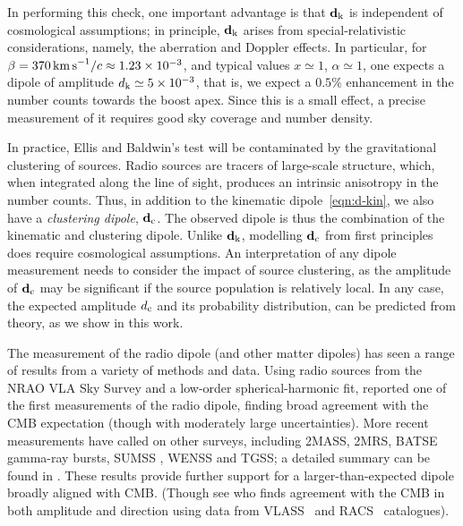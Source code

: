 \documentclass[fleqn,usenatbib]{mnras}
\def\kin{{\rm k}}
\def\clu{{\rm c}}
\def\dkin{\mathbf{d}_{\kin}}
\def\dint{\mathbf{d}_{\clu}}
\begin{document}
In performing this check, one important advantage
is that $\dkin$ is independent of cosmological
assumptions; in principle, $\dkin$ arises from special-relativistic considerations, namely, the aberration and
Doppler effects. 
In particular, for $\beta=370\,{\rm km\,s}^{-1}/c\approx1.23\times10^{-3}$, and typical values
$x\simeq1$, $\alpha\simeq1$, one expects a dipole of amplitude $d_\kin\simeq5\times10^{-3}$, 
that is, we expect a $0.5\%$ enhancement in the number counts towards the boost apex. Since this is a small
effect, a precise measurement of it requires good sky coverage and number density.

In practice, Ellis and Baldwin's  test will  be contaminated by the gravitational
clustering of sources. Radio sources are tracers of large-scale structure, which,
when integrated along the line of sight, produces an intrinsic anisotropy in the number counts. 
Thus, in addition to the kinematic
dipole~\eqref{eqn:d-kin}, we also have a \emph{clustering dipole}, $\dint$.
The observed dipole is thus the combination of the kinematic and clustering dipole.
Unlike $\dkin$, modelling $\dint$ from first principles does require cosmological assumptions.
An interpretation of any dipole measurement needs to consider the impact of source clustering,
as the amplitude of $\dint$ may be significant if the source population is relatively local.
%
In any case, the expected amplitude $d_\clu$ and its probability distribution, can be predicted from theory, as we show
in this work.

The measurement of the radio dipole (and other matter dipoles) has seen a range
of results from a variety of methods and data.
Using radio sources from the NRAO VLA Sky Survey \citep[NVSS;][]{NVSS}
and a low-order spherical-harmonic fit, \citet{2002Natur.416..150B} reported one
of the first measurements of the radio dipole, finding broad agreement with the CMB
expectation (though with moderately large uncertainties).
%
More recent measurements \citep{2011ApJ...742L..23S,2012MNRAS.427.1994G,2013A&A...555A.117R,2017MNRAS.471.1045C,2018JCAP...04..031B}
have called on other surveys, including 2MASS, 2MRS,
BATSE gamma-ray bursts, SUMSS \citep{SUMSS}, WENSS \citep{WENSS} and TGSS;
a detailed summary can be found in \citet*{2021A&A...653A...9S}. 
These results provide further support for a larger-than-expected dipole
broadly aligned with CMB.
(Though see \citet{Darling:2022jxt} who finds agreement with the CMB
in both amplitude and direction using data
from VLASS~\citep{2020PASP..132c5001L} and RACS~\citep{2020PASA...37...48M}
catalogues).
\end{document}

